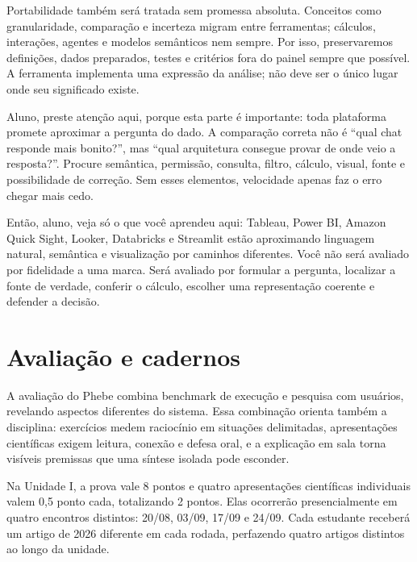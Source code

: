 Portabilidade também será tratada sem promessa absoluta. Conceitos como granularidade, comparação e incerteza migram entre ferramentas; cálculos, interações, agentes e modelos semânticos nem sempre. Por isso, preservaremos definições, dados preparados, testes e critérios fora do painel sempre que possível. A ferramenta implementa uma expressão da análise; não deve ser o único lugar onde seu significado existe.

\begin{GuidedBox}
Aluno, preste atenção aqui, porque esta parte é importante: toda plataforma promete aproximar a pergunta do dado. A comparação correta não é ``qual chat responde mais bonito?'', mas ``qual arquitetura consegue provar de onde veio a resposta?''. Procure semântica, permissão, consulta, filtro, cálculo, visual, fonte e possibilidade de correção. Sem esses elementos, velocidade apenas faz o erro chegar mais cedo.
\end{GuidedBox}

\begin{SummaryBox}
Então, aluno, veja só o que você aprendeu aqui: Tableau, Power BI, Amazon Quick Sight, Looker, Databricks e Streamlit estão aproximando linguagem natural, semântica e visualização por caminhos diferentes. Você não será avaliado por fidelidade a uma marca. Será avaliado por formular a pergunta, localizar a fonte de verdade, conferir o cálculo, escolher uma representação coerente e defender a decisão.
\end{SummaryBox}

\section{Avaliação e cadernos}

A avaliação do Phebe combina benchmark de execução e pesquisa com usuários, revelando aspectos diferentes do sistema. Essa combinação orienta também a disciplina: exercícios medem raciocínio em situações delimitadas, apresentações científicas exigem leitura, conexão e defesa oral, e a explicação em sala torna visíveis premissas que uma síntese isolada pode esconder.

Na Unidade I, a prova vale 8 pontos e quatro apresentações científicas individuais valem 0,5 ponto cada, totalizando 2 pontos. Elas ocorrerão presencialmente em quatro encontros distintos: 20/08, 03/09, 17/09 e 24/09. Cada estudante receberá um artigo de 2026 diferente em cada rodada, perfazendo quatro artigos distintos ao longo da unidade.

